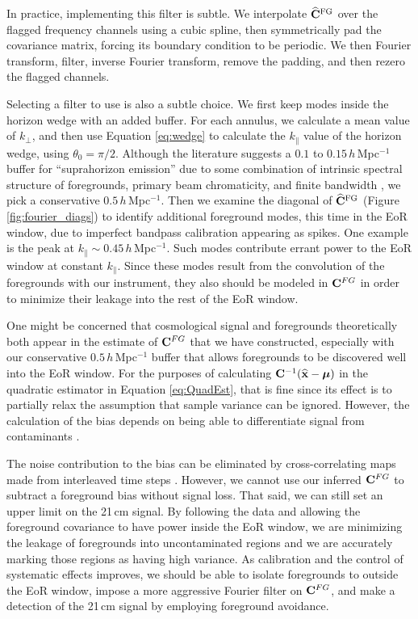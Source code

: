 In practice, implementing this filter is subtle. We interpolate $\widehat{\mathbf{C}}^\text{FG}$ over the flagged frequency channels using a cubic spline, then symmetrically pad the covariance matrix, forcing its boundary condition to be periodic. We then Fourier transform, filter, inverse Fourier transform, remove the padding, and then rezero the flagged channels. 

Selecting a filter to use is also a subtle choice. We first keep modes inside the horizon wedge with an added buffer. For each annulus, we calculate a mean value of $k_\perp$, and then use Equation \eqref{eq:wedge} to calculate the $k_\|$ value of the horizon wedge, using $\theta_0 = \pi/2$. Although the literature suggests a $0.1$ to $0.15$\,$h$\,Mpc$^{-1}$ buffer for ``suprahorizon emission'' due to some combination of intrinsic spectral structure of foregrounds, primary beam chromaticity, and finite bandwidth \citep{pober13,PoberNextGen}, we pick a conservative $0.5$\,$h$\,Mpc$^{-1}$. Then we examine the diagonal of $\widehat{\mathbf{C}}^\text{FG}$ (Figure \ref{fig:fourier_diags}) to identify additional foreground modes, this time in the EoR window, due to imperfect bandpass calibration appearing as spikes. One example is the peak at $k_\| \sim 0.45$\,$h$\,Mpc$^{-1}$. Such modes contribute errant power to the EoR window at constant $k_\|$. Since these modes result from the convolution of the foregrounds with our instrument, they also should be modeled in $\mathbf{C}^{FG}$ in order to minimize their leakage into the rest of the EoR window. 

One might be concerned that cosmological signal and foregrounds theoretically both appear in the estimate of $\mathbf{C}^{FG}$ that we have constructed, especially with our conservative $0.5$\,$h$\,Mpc$^{-1}$ buffer that allows foregrounds to be discovered well into the EoR window. For the purposes of calculating $\mathbf{C}^{-1}(\widehat{\mathbf{x}}-\boldsymbol\mu)$ in the quadratic estimator in Equation \eqref{eq:QuadEst}, that is fine since its effect is to partially relax the assumption that sample variance can be ignored. However, the calculation of the bias depends on being able to differentiate signal from contaminants \citep{Maxpowerspeclossless,LT11,DillonFast}. 

The noise contribution to the bias can be eliminated by cross-correlating maps made from interleaved time steps \citep{X13}. However, we cannot use our inferred $\mathbf{C}^{FG}$ to subtract a foreground bias without signal loss. That said, we can still set an upper limit on the 21\,cm signal. By following the data and allowing the foreground covariance to have power inside the EoR window, we are minimizing the leakage of foregrounds into uncontaminated regions and we are accurately marking those regions as having high variance. As calibration and the control of systematic effects improves, we should be able to isolate foregrounds to outside the EoR window, impose a more aggressive Fourier filter on $\mathbf{C}^{FG}$, and make a detection of the 21\,cm signal by employing foreground avoidance.

